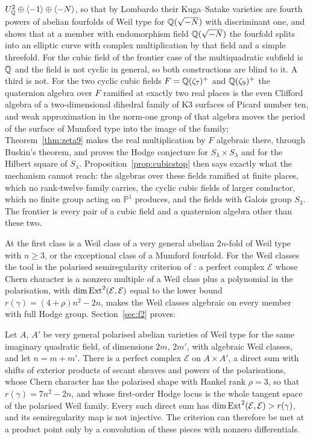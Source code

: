 $U_{\mathbb{Q}}^{2}\oplus\langle-1\rangle\oplus\langle-N\rangle$, so that by Lombardo their Kuga--Satake varieties are fourth powers of abelian fourfolds of Weil type for $\mathbb{Q}(\sqrt{-N})$ with discriminant one, and shows that at a member with endomorphism field $\mathbb{Q}(\sqrt{-N})$ the fourfold splits into an elliptic curve with complex multiplication by that field and a simple threefold. For the cubic field of the frontier case of \cite{BMB26} the multiquadratic subfield is $\mathbb{Q}$ and the field is not cyclic in general, so both constructions are blind to it. A third is not. For the two cyclic cubic fields $F=\mathbb{Q}(\zeta_{7})^{+}$ and $\mathbb{Q}(\zeta_{9})^{+}$ the quaternion algebra over $F$ ramified at exactly two real places is the even Clifford algebra of a two-dimensional dihedral family of K3 surfaces of Picard number ten, and weak approximation in the norm-one group of that algebra moves the period of the surface of Mumford type into the image of the family; Theorem~\ref{thm:zeta9} makes the real multiplication by $F$ algebraic there, through Buskin's theorem, and proves the Hodge conjecture for $S_{\lambda}\times S_{\lambda}$ and for the Hilbert square of $S_{\lambda}$. Proposition~\ref{prop:cubicstop} then says exactly what the mechanism cannot reach: the algebras over these fields ramified at finite places, which no rank-twelve family carries, the cyclic cubic fields of larger conductor, which no finite group acting on $\mathbb{P}^{1}$ produces, and the fields with Galois group $S_{3}$. The frontier is every pair of a cubic field and a quaternion algebra other than these two.

At \Fii{} the first class is a Weil class of a very general abelian $2n$-fold of Weil type with $n\ge3$, or the exceptional class of a Mumford fourfold. For the Weil classes the tool is the polarised semiregularity criterion of \cite{BMB26}: a perfect complex $\mathcal{E}$ whose Chern character is a nonzero multiple of a Weil class plus a polynomial in the polarisation, with $\dim\mathrm{Ext}^{2}(\mathcal{E},\mathcal{E})$ equal to the lower bound $r(\gamma)=(4+\rho)n^{2}-2n$, makes the Weil classes algebraic on every member with full Hodge group. Section~\ref{sec:f2} proves:

\begin{theorem}\label{thm:intro-product}
Let $A$, $A'$ be very general polarised abelian varieties of Weil type for the same imaginary quadratic field, of dimensions $2m$, $2m'$, with algebraic Weil classes, and let $n=m+m'$. There is a perfect complex $\mathcal{E}$ on $A\times A'$, a direct sum with shifts of exterior products of secant sheaves and powers of the polarisations, whose Chern character has the polarised shape with Hankel rank $\rho=3$, so that $r(\gamma)=7n^{2}-2n$, and whose first-order Hodge locus is the whole tangent space of the polarised Weil family. Every such direct sum has $\dim\mathrm{Ext}^{2}(\mathcal{E},\mathcal{E})>r(\gamma)$, and its semiregularity map is not injective. The criterion can therefore be met at a product point only by a convolution of these pieces with nonzero differentials.
\end{theorem}

